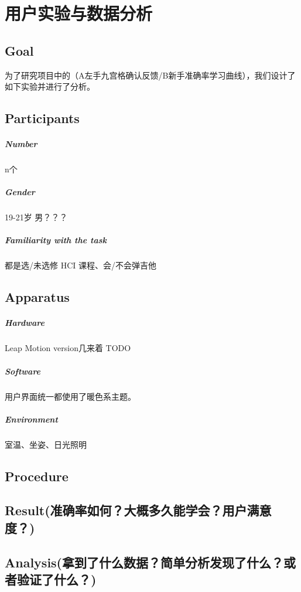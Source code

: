\chapter{用户实验与数据分析}

    \section{Goal}
    为了研究项目中的（A左手九宫格确认反馈/B新手准确率学习曲线），我们设计了如下实验并进行了分析。

    \section{Participants}
        \paragraph{Number}
        n个
        \paragraph{Gender}
        19-21岁 男？？？
        \paragraph{Familiarity with the task}
        都是选/未选修 HCI 课程、会/不会弹吉他

    \section{Apparatus}
        \paragraph{Hardware}
        Leap Motion version几来着 TODO

        \paragraph{Software}
        用户界面统一都使用了暖色系主题。

        \paragraph{Environment}
        室温、坐姿、日光照明

    \section{Procedure}

    \section{Result(准确率如何？大概多久能学会？用户满意度？)}

    \section{Analysis(拿到了什么数据？简单分析发现了什么？或者验证了什么？)}
